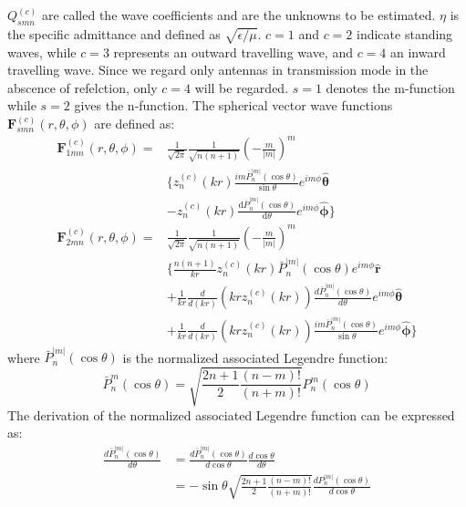 \documentclass{article}
\begin{document}
\(Q_{smn}^{(c)}\) are called the wave coefficients and are the unknowns to be estimated. \(\eta\) is the specific admittance and defined as \(\sqrt{\epsilon/\mu}\). \(c = 1\) and \(c = 2\) indicate standing waves, while \(c = 3\) represents an outward travelling wave, and \(c = 4\) an inward travelling wave. Since we regard only antennas in transmission mode in the abscence of refelction, only \(c=4\) will be regarded. \(s = 1\) denotes the m-function while \(s = 2\) gives the n-function. The spherical vector wave functions \(\mathbf{F}_{smn}^{(c)}(r,\theta,\phi)\) are defined as:
\begin{equation}
    \begin{split}
        \mathbf{F}_{1mn}^{(c)}(r,\theta,\phi) = &\frac{1}{\sqrt{2 \pi}} \frac{1}{\sqrt{n(n+1)}} \left( -\frac{m}{|m|} \right)^m \\
        &\Bigg\{ z_n^{(c)}(kr) \frac{i m \overline{P}_n^{|m|}(\cos \theta)}{\sin \theta} e^{i m \phi} \boldsymbol{\hat{\theta}} \\
        &- z_n^{(c)}(kr) \frac{\mathrm{d} \overline{P}_n^{|m|}(\cos \theta)}{\mathrm{d} \theta} e^{i m \phi} \boldsymbol{\hat{\phi}} \Bigg\} \\
        \mathbf{F}_{2mn}^{(c)}(r, \theta, \phi) = &\frac{1}{\sqrt{2\pi}} \frac{1}{\sqrt{n(n+1)}} \left( -\frac{m}{|m|} \right)^m \\
        &\Bigg\{ \frac{n(n+1)}{kr} z_n^{(c)}(kr) \bar{P}_n^{|m|}(\cos \theta) e^{im\phi} \boldsymbol{\hat{r}} \\
        &+ \frac{1}{kr} \frac{d}{d(kr)} \left( kr z_n^{(c)}(kr) \right) \frac{d \bar{P}_n^{|m|}(\cos \theta)}{d\theta} e^{im\phi} \boldsymbol{\hat{\theta}} \\
        &+ \frac{1}{kr} \frac{d}{d(kr)} \left( kr z_n^{(c)}(kr) \right) \frac{im \bar{P}_n^{|m|}(\cos \theta)}{\sin \theta} e^{im\phi} \boldsymbol{\hat{\phi}} \Bigg\}
    \end{split}
\end{equation}
where \(\bar{P}_n^{|m|}(\cos \theta)\) is the normalized associated Legendre function:
\begin{equation}
    \bar{P}_n^m(\cos \theta) = \sqrt{\frac{2n+1}{2} \frac{(n-m)!}{(n+m)!}} P_n^m(\cos \theta)
\end{equation}
The derivation of the normalized associated Legendre function can be expressed as:
\begin{equation}
    \begin{split}
        \frac{d \bar{P}_n^{|m|}(\cos \theta)}{d\theta} &= \frac{d \bar{P}_n^{|m|}(\cos \theta)}{d\cos \theta} \frac{d\cos \theta}{d\theta} \\
        &= -\sin\theta \sqrt{\frac{2n+1}{2} \frac{(n-m)!}{(n+m)!}} \frac{dP_n^{|m|}(\cos \theta)}{d\cos \theta}
    \end{split}
\end{equation}
\end{document}
